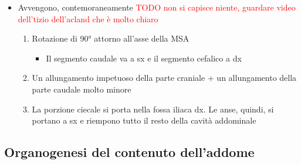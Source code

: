 \documentclass[italian,]{article}
\providecommand{\tightlist}{%
  \setlength{\itemsep}{0pt}\setlength{\parskip}{0pt}}
\newcommand{\TODO}[1]{\textcolor{red}{\textsf{\footnotesize{TODO #1}}}} %
\begin{document}
\begin{itemize}
\tightlist
\item
  Avvengono, contemoraneamente
  \TODO{non si capisce niente, guardare video dell'tizio dell'acland che è molto chiaro}

  \begin{enumerate}
  \def\labelenumi{\arabic{enumi}.}
  \tightlist
  \item
    Rotazione di 90° attorno all'asse della MSA

    \begin{itemize}
    \tightlist
    \item
      Il segmento caudale va a sx e il segmento cefalico a dx
    \end{itemize}
  \item
    Un allungamento impetuoso della parte craniale + un allungamento
    della parte caudale molto minore
  \item
    La porzione ciecale si porta nella fossa iliaca dx. Le anse, quindi,
    si portano a sx e riempono tutto il resto della cavità addominale
  \end{enumerate}
\end{itemize}

\hypertarget{organogenesi-del-contenuto-delladdome}{%
\subsection{Organogenesi del contenuto
dell'addome}\label{organogenesi-del-contenuto-delladdome}}
\end{document}
